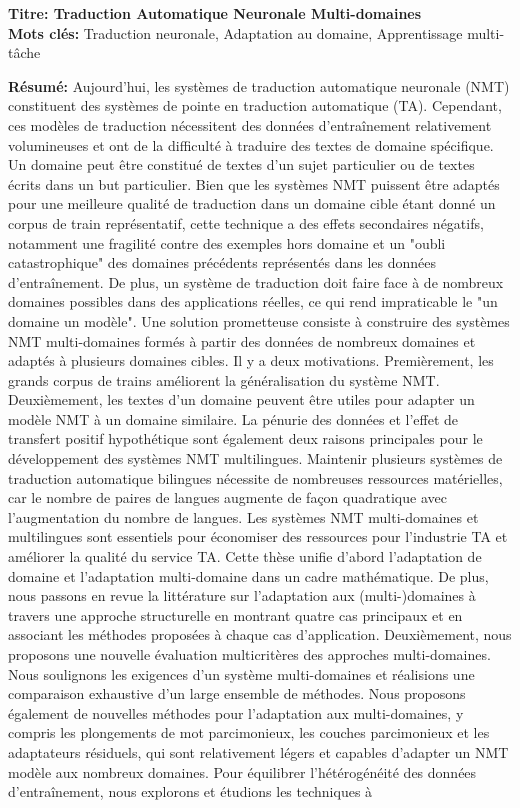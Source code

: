 \begin{mdframed}[linecolor=Prune,linewidth=1,nobreak=false]
\footnotesize	
\onehalfspacing
\textbf{Titre: Traduction Automatique Neuronale Multi-domaines} \\
\noindent \textbf{Mots clés:} Traduction neuronale, Adaptation au domaine, Apprentissage multi-tâche
\vspace{-.1cm}
\begin{multicols}{2}
\noindent \textbf{Résumé:} Aujourd'hui, les systèmes de traduction automatique neuronale (NMT) constituent des systèmes de pointe en traduction automatique (TA). Cependant, ces modèles de traduction nécessitent des données d'entraînement relativement volumineuses et ont de la difficulté à traduire des textes de domaine spécifique. Un domaine peut être constitué de textes d'un sujet particulier ou de textes écrits dans un but particulier. Bien que les systèmes NMT puissent être adaptés pour une meilleure qualité de traduction dans un domaine cible étant donné un corpus de train représentatif, cette technique a des effets secondaires négatifs, notamment une fragilité contre des exemples hors domaine et un "oubli catastrophique" des domaines précédents représentés dans les données d'entraînement. De plus, un système de traduction doit faire face à de nombreux domaines possibles dans des applications réelles, ce qui rend impraticable le "un domaine un modèle". Une solution prometteuse consiste à construire des systèmes NMT multi-domaines formés à partir des données de nombreux domaines et adaptés à plusieurs domaines cibles. Il y a deux motivations. Premièrement, les grands corpus de trains améliorent la généralisation du système NMT. Deuxièmement, les textes d'un domaine peuvent être utiles pour adapter un modèle NMT à un domaine similaire. La pénurie des données et l'effet de transfert positif hypothétique sont également deux raisons principales pour le développement des systèmes NMT multilingues. Maintenir plusieurs systèmes de traduction automatique bilingues nécessite de nombreuses ressources matérielles, car le nombre de paires de langues augmente de façon quadratique avec l'augmentation du nombre de langues. Les systèmes NMT multi-domaines et multilingues sont essentiels pour économiser des ressources pour l'industrie TA et améliorer la qualité du service TA. Cette thèse unifie d'abord l'adaptation de domaine et l'adaptation multi-domaine dans un cadre mathématique. De plus, nous passons en revue la littérature sur l'adaptation aux (multi-)domaines à travers une approche structurelle en montrant quatre cas principaux et en associant les méthodes proposées à chaque cas d'application. Deuxièmement, nous proposons une nouvelle évaluation multicritères des approches multi-domaines. Nous soulignons les exigences d'un système multi-domaines et réalisions une comparaison exhaustive d'un large ensemble de méthodes. Nous proposons également de nouvelles méthodes pour l'adaptation aux multi-domaines, y compris les plongements de mot parcimonieux, les couches parcimonieux et les adaptateurs résiduels, qui sont relativement légers et capables d'adapter un NMT modèle aux nombreux domaines. Pour équilibrer l'hétérogénéité des données d'entraînement, nous explorons et étudions les techniques à 
\end{multicols}
\end{mdframed}
